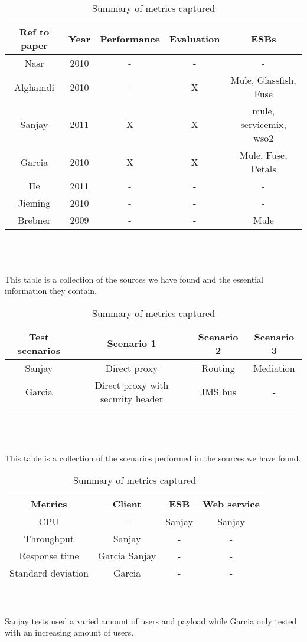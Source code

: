 \begin{table}[H]
	\caption{Summary of academic papers and what test they perform}
	\begin{tabular}{c c c c c}

		Ref to paper & Year & Performance & Evaluation & ESBs \\ 
		\hline
		Nasr \cite{Nasr2010} & 2010 & - & - & - \\ 
		Alghamdi \cite{Alghamdi2010} & 2010 & - & X & Mule, Glassfish, Fuse\\
		Sanjay \cite{Sanjay2011} & 2011 & X & X & mule, servicemix, wso2 \\ 
		Garcia \cite{Garcia2010} & 2010 & X & X & Mule, Fuse, Petals \\
		He \cite{HeIntegration} & 2011 & - & - & -\\
		Jieming \cite{Jieming2010} & 2010 & - & - & - \\
		Brebner \cite{Brebner2009} & 2009 & - & - & Mule \\
		\hline
	\end{tabular}
	\\ 
	\\
	\\
	\hspace{9em}
	This table is a collection of the sources we have found and the essential information they contain.

	\caption{Summary of the scenarios in the academic performance tests}
	\begin{tabular}{c c c c}

		Test scenarios & Scenario 1 & Scenario 2 & Scenario 3 \\
		\hline
		Sanjay \cite{Sanjay2011} & Direct proxy & Routing & Mediation \\ 

		Garcia \cite{Garcia2010} & Direct proxy with security header & JMS bus & - \\ 
		\hline
	\end{tabular}
	\\
	\\
	\\
	This table is a collection of the scenarios performed in the sources we have found.
	
	\caption{Summary of metrics captured}
	\begin{tabular}{c c c c}
	Metrics &  Client & ESB & Web service \\
	\hline
	CPU & - & Sanjay \cite{Sanjay2011} & Sanjay \cite{Sanjay2011}\\
	Throughput & Sanjay \cite{Sanjay2011} & - & - \\
	Response time & Garcia \cite{Garcia2010} Sanjay \cite{Sanjay2011} & - & - \\
	Standard deviation & Garcia \cite{Garcia2010} & - & - \\
	\hline
	\end{tabular}
	\\
	\\
	Sanjay \cite{Sanjay2011} tests used a varied amount of users and payload while Garcia \cite{Garcia2010} only tested with an increasing amount of users.
\end{table}

